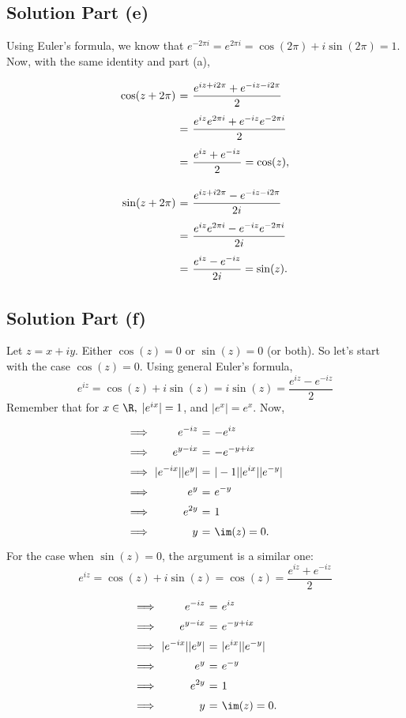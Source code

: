 \subsection*{Solution Part (e)}
Using Euler's formula, we know that $e^{-2\pi i} = e^{2\pi i} = \cos(2\pi) + i\sin(2\pi) = 1$. Now, with the same identity and part (a),
\[ \everymath{\displaystyle}
\arraycolsep=1.8pt\def\arraystretch{2.5}
\begin{array}{rcl}
    \cos(z+2\pi) & = & \frac{e^{iz+i2\pi}+e^{-iz - i2\pi}}{2}\\
    & = & \frac{e^{iz}e^{2\pi i}+e^{-iz }e^{-2\pi i}}{2}\\
    & = & \frac{e^{iz}+e^{-iz}}{2} = \cos(z),
\end{array} \]
\[ \everymath{\displaystyle}
\arraycolsep=1.8pt\def\arraystretch{2.5}
\begin{array}{rcl}
    \sin(z+2\pi) & = & \frac{e^{iz+i2\pi}-e^{-iz - i2\pi}}{2i}\\
    & = & \frac{e^{iz}e^{2\pi i}-e^{-iz }e^{-2\pi i}}{2i}\\
    & = & \frac{e^{iz}-e^{-iz}}{2i} = \sin(z).
\end{array} \]

\subsection*{Solution Part (f)}
Let $z = x+iy$. Either $\cos(z) = 0$ or $\sin(z) = 0$ (or both). So let's start with the case $\cos(z) = 0$. Using general Euler's formula,
\[ e^{iz} = \cos(z) + i \sin (z) = i\sin(z) =  \frac{e^{iz}-e^{-iz}}{2} \]
Remember that for $x\in\R,\; |e^{ix}| = 1$, and $|e^x| = e^x$. Now,
\[ \everymath{\displaystyle}
\arraycolsep=1.8pt\def\arraystretch{1.5}
\begin{array}{rrcl}
    \implies & e^{-iz} & = & -e^{iz}\\
    \implies & e^{y-ix} & = & -e^{-y+ix}\\
    \implies & |e^{-ix}||e^{y}| & = & |-1||e^{ix}||e^{-y}|\\
    \implies & e^y & = & e^{-y}\\
    \implies & e^{2y} & = & 1\\
    \implies & y & = & \im(z) = 0.
\end{array}\]
For the case when $\sin(z) = 0$, the argument is a similar one:
\[ e^{iz} = \cos(z) + i \sin (z) = \cos(z) =  \frac{e^{iz}+e^{-iz}}{2} \]
\[ \everymath{\displaystyle}
\arraycolsep=1.8pt\def\arraystretch{1.5}
\begin{array}{rrcl}
    \implies & e^{-iz} & = & e^{iz}\\
    \implies & e^{y-ix} & = & e^{-y+ix}\\
    \implies & |e^{-ix}||e^{y}| & = & |e^{ix}||e^{-y}|\\
    \implies & e^y & = & e^{-y}\\
    \implies & e^{2y} & = & 1\\
    \implies & y & = & \im(z) = 0.
\end{array}\]


